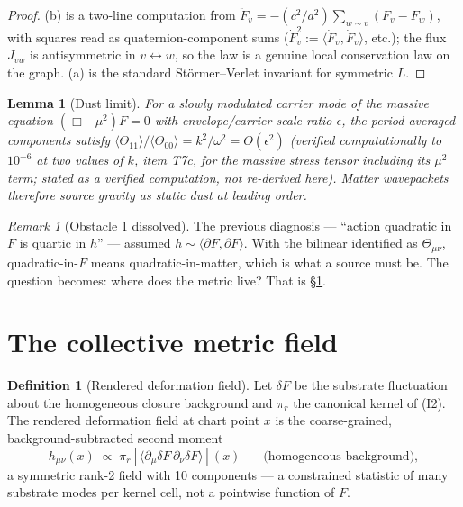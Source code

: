 \documentclass[12pt]{article}
\newtheorem{lemma}[theorem]{Lemma}
\theoremstyle{definition}
\newtheorem{definition}[theorem]{Definition}
\theoremstyle{remark}
\newtheorem{remark}[theorem]{Remark}
\newcommand{\Th}{\Theta}
\begin{document}
\begin{proof}
(b) is a two-line computation from $\ddot F_v = -(c^2/a^2)\sum_{w\sim v}(F_v - F_w)$, with squares read as quaternion-component sums ($\dot F_v^2 := \langle\dot F_v, \dot F_v\rangle$, etc.); the flux $J_{vw}$ is antisymmetric in $v \leftrightarrow w$, so the law is a genuine local conservation law on the graph. (a) is the standard St\"ormer--Verlet invariant for symmetric $L$.
\end{proof}

\begin{lemma}[Dust limit]\label{lem:dust}
For a slowly modulated carrier mode of the massive equation $(\Box - \mu^2)F = 0$ with envelope/carrier scale ratio $\epsilon$, the period-averaged components satisfy $\langle\Th_{11}\rangle/\langle\Th_{00}\rangle = k^2/\omega^2 = O(\epsilon^2)$ (verified computationally to $10^{-6}$ at two values of $k$, item T7c, for the massive stress tensor including its $\mu^2$ term; stated as a verified computation, not re-derived here). Matter wavepackets therefore source gravity as static dust at leading order.
\end{lemma}

\begin{remark}[Obstacle 1 dissolved]
The previous diagnosis --- ``action quadratic in $F$ is quartic in $h$'' --- assumed $h \sim \langle\partial F, \partial F\rangle$. With the bilinear identified as $\Th_{\mu\nu}$, quadratic-in-$F$ means quadratic-in-matter, which is what a source must be. The question becomes: where does the metric live? That is \S\ref{sec:collective}.
\end{remark}

\section{The collective metric field}\label{sec:collective}

\begin{definition}[Rendered deformation field]\label{def:collective}
Let $\delta F$ be the substrate fluctuation about the homogeneous closure background and $\pi_r$ the canonical kernel of (I2). The rendered deformation field at chart point $x$ is the coarse-grained, background-subtracted second moment
\begin{equation}
h_{\mu\nu}(x) \;\propto\; \pi_r\!\left[\langle \partial_\mu \delta F\,\partial_\nu \delta F\rangle\right](x) \;-\; \text{(homogeneous background)},
\end{equation}
a symmetric rank-2 field with 10 components --- a constrained statistic of many substrate modes per kernel cell, not a pointwise function of $F$.
\end{definition}
\end{document}
